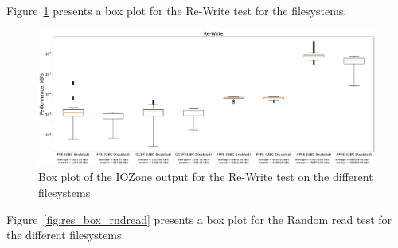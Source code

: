 \FloatBarrier

Figure~\ref{fig:res_box_rewrite} presents a box plot for the \mbox{Re-Write} test for the filesystems. 

\begin{figure}[!ht]
	\label{fig:res_box_rewrite}
	\begin{center}
		\includegraphics[width=1.0\textwidth]{figures.nosync/benchmarking/Re-Write-boxplot.pdf}
	\end{center}
	\caption{Box plot of the IOZone output for the Re-Write test on the different filesystems}
\end{figure}

\FloatBarrier

Figure~\ref{fig:res_box_rndread} presents a box plot for the Random read test for the different filesystems. 

